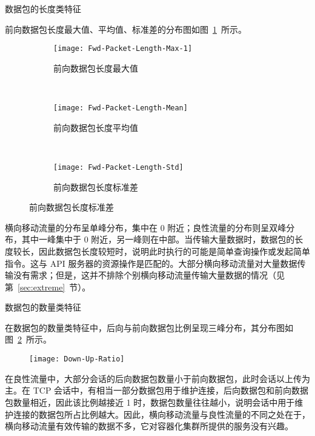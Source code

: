 {\begin{itemize}
\item {数据包的长度类特征

前向数据包长度最大值、平均值、标准差的分布图如图~\ref{fig:fwd-packet-length}~所示。

\begin{figure}[t]
    \centering
    \begin{subfigure}[b]{0.48\textwidth}
      \texttt{[image: Fwd-Packet-Length-Max-1]}
      \caption{前向数据包长度最大值}
    \end{subfigure}
    ~
    \begin{subfigure}[b]{0.48\textwidth}
      \texttt{[image: Fwd-Packet-Length-Mean]}
      \caption{前向数据包长度平均值}
    \end{subfigure}
    \\
    \begin{subfigure}[b]{0.48\textwidth}
      \texttt{[image: Fwd-Packet-Length-Std]}
      \caption{前向数据包长度标准差}
    \end{subfigure}
    \label{fig:fwd-packet-length}
\end{figure}

横向移动流量的分布呈单峰分布，集中在 0 附近；良性流量的分布则呈双峰分布，其中一峰集中于 0 附近，另一峰则在中部。当传输大量数据时，数据包的长度较长，因此数据包长度较短时，说明此时执行的可能是简单查询操作或发起简单指令。这与 API 服务器的资源操作是匹配的。大部分横向移动流量对大量数据传输没有需求；但是，这并不排除个别横向移动流量传输大量数据的情况（见第~\ref{sec:extreme}~节）。

\item {数据包的数量类特征

在数据包的数量类特征中，后向与前向数据包比例呈现三峰分布，其分布图如图~\ref{fig:down-up-ratio}~所示。

\begin{figure}[t]
    \centering
    \texttt{[image: Down-Up-Ratio]}
    \label{fig:down-up-ratio}
\end{figure}

在良性流量中，大部分会话的后向数据包数量小于前向数据包，此时会话以上传为主。在 TCP 会话中，有相当一部分数据包用于维护连接，后向数据包和前向数据包数量相近，因此该比例越接近 1 时，数据包数量往往越小，说明会话中用于维护连接的数据包所占比例越大。因此，横向移动流量与良性流量的不同之处在于，横向移动流量有效传输的数据不多，它对容器化集群所提供的服务没有兴趣。
}
}
\end{itemize}

}
